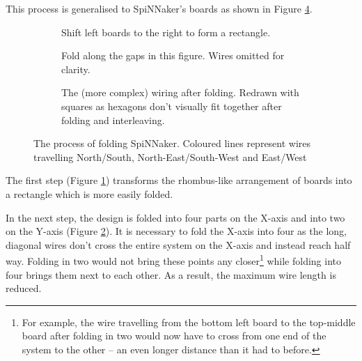			This process is generalised to SpiNNaker's boards as shown in Figure
			\ref{fig:boardsFolded}.
			
			\begin{figure}
				\center
				\begin{subfigure}[b]{\textwidth}
					\center
					
					\caption{Shift left boards to the right to form a rectangle.}
					\label{fig:boardsFoldedShift}
				\end{subfigure}
				
				\vspace{2ex}
				
				\begin{subfigure}[b]{\textwidth}
					\center
					
					\caption{Fold along the gaps in this figure. Wires omitted for
					clarity.}
					\label{fig:boardsFoldedSpaced}
				\end{subfigure}
				
				\vspace{2ex}
				
				\begin{subfigure}[b]{\textwidth}
					\center
					
					\caption{The (more complex) wiring after folding. Redrawn with squares
					as hexagons don't visually fit together after folding and
					interleaving.}
					\label{fig:boardsFoldedInterleaved}
				\end{subfigure}
				
				\caption[Folding SpiNNaker]{The process of folding SpiNNaker. Coloured
				lines represent wires travelling {\color{red}North/South},
				{\color{green}North-East/South-West} and {\color{blue}East/West}}
				\label{fig:boardsFolded}
			\end{figure}
			
			The first step (Figure \ref{fig:boardsFoldedShift}) transforms the
			rhombus-like arrangement of boards into a rectangle which is more easily
			folded.
			
			In the next step, the design is folded into four parts on the X-axis and
			into two on the Y-axis (Figure \ref{fig:boardsFoldedSpaced}). It is
			necessary to fold the X-axis into four as the long, diagonal wires don't
			cross the entire system on the X-axis and instead reach half way. Folding
			in two would not bring these points any closer\footnote{For example, the
			wire travelling from the bottom left board to the top-middle board after
			folding in two would now have to cross from one end of the system to the
			other -- an even longer distance than it had to before.} while folding
			into four brings them next to each other. As a result, the maximum wire
			length is reduced.
			
